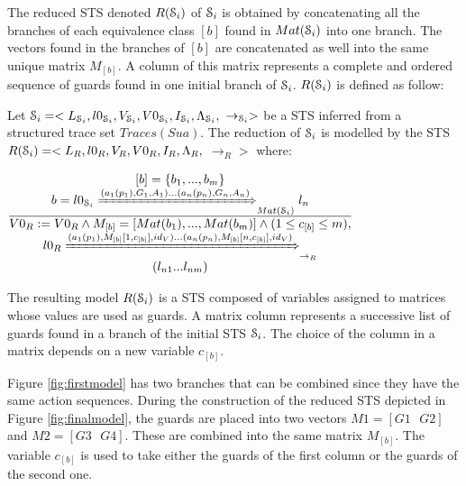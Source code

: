 The reduced STS denoted $R(\EuScript{S}_i)$ of $\EuScript{S}_i$
is obtained by concatenating all the branches of each equivalence
class $[b]$ found in $Mat(\EuScript{S}_i)$ into one branch. The
vectors found in the branches of $[b]$ are concatenated as well
into the same unique matrix $M_{[b]}$. A column of this matrix
represents a complete and ordered sequence of guards found in one
initial branch of $\EuScript{S}_i$. $R(\EuScript{S}_i)$ is
defined as follow:

\begin{definition}%
	\label{rule:min}

	Let $\EuScript{S}_i=<L_{\EuScript{S}_i},l0_{\EuScript{S}_i},V_{\EuScript{S}_i},V0_{\EuScript{S}_i},I_{\EuScript{S}_i},\Lambda_{\EuScript{S}_i},$ $\rightarrow_{\EuScript{S}_i}>$ be
    a STS inferred from a structured trace set $Traces(Sua)$. The reduction of $\EuScript{S}_i$ is modelled by the STS
	$R(\EuScript{S}_i)= <L_R,l0_R,V_R,V0_R,I_R,\Lambda_R,$
	$\rightarrow_R>$ where:

  \begin{center}
  $\frac{\begin{matrix}
      [b]=\{b_1,...,b_m\}\\
      b=l0_{\EuScript{S}_i} \xRightarrow{(a_1(p_1),G_{1},A_{1})...(a_n(p_n),G_{n},A_{n})}_{Mat(\EuScript{S}_i)} l_{n}\\
    \end{matrix}
  }
  {\begin{matrix}
      V0_R:=V0_R \wedge M_{[b]}=[Mat(b_1),...,Mat(b_m)] \wedge (1 \leq c_{[b]} \leq m),\\
      l0_R \xRightarrow{(a_1(p_1),M_{[b]}[1,c_{[b]}],id_V)... (a_n(p_n),M_{[b]}[n,c_{[b]}],id_V)}_{\rightarrow_R}\\  (l_{n1}...l_{nm})
    \end{matrix}
  }$
  \end{center}
\end{definition}

The resulting model $R(\EuScript{S}_i)$ is a STS composed of
variables assigned to matrices whose values are used as guards. A
matrix column represents a successive list of guards found in a
branch of the initial STS $\EuScript{S}_i$. The choice of the
column in a matrix depends on a new variable $c_{[b]}$.

Figure \ref{fig:firstmodel} has two branches that can be combined
since they have the same action sequences. During the
construction of the reduced STS depicted in Figure
\ref{fig:finalmodel}, the guards are placed into two vectors
$M1=[G1\text{ }G2]$ and $M2=[G3\text{ }G4]$.  These are combined
into the same matrix $M_{[b]}$. The variable $c_{[b]}$ is used to
take either the guards of the first column or the guards of the
second one.


